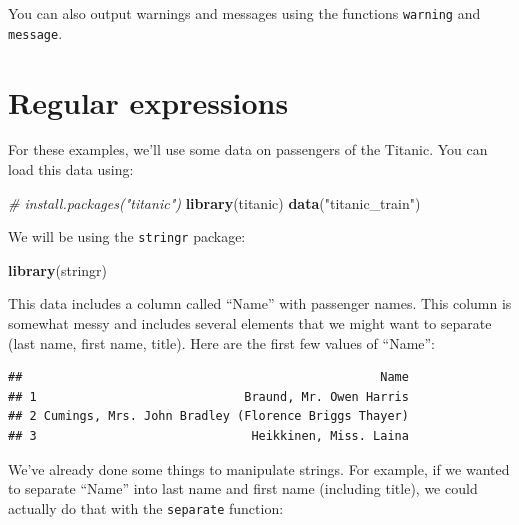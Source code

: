 \documentclass[]{book}
\makeatletter
\newenvironment{Shaded}{\begin{snugshade}}{\end{snugshade}}
\newcommand{\KeywordTok}[1]{\textcolor[rgb]{0.13,0.29,0.53}{\textbf{{#1}}}}
\newcommand{\DecValTok}[1]{\textcolor[rgb]{0.00,0.00,0.81}{{#1}}}
\newcommand{\StringTok}[1]{\textcolor[rgb]{0.31,0.60,0.02}{{#1}}}
\newcommand{\CommentTok}[1]{\textcolor[rgb]{0.56,0.35,0.01}{\textit{{#1}}}}
\newcommand{\NormalTok}[1]{{#1}}
\newenvironment{kframe}{%
\medskip{}
\setlength{\fboxsep}{.8em}
 \def\at@end@of@kframe{}%
 \ifinner\ifhmode%
  \def\at@end@of@kframe{\end{minipage}}%
  \begin{minipage}{\columnwidth}%
 \fi\fi%
 \def\FrameCommand##1{\hskip\@totalleftmargin \hskip-\fboxsep
 \colorbox{shadecolor}{##1}\hskip-\fboxsep
     \hskip-\linewidth \hskip-\@totalleftmargin \hskip\columnwidth}%
 \MakeFramed {\advance\hsize-\width
   \@totalleftmargin\z@ \linewidth\hsize
   \@setminipage}}%
 {\par\unskip\endMakeFramed%
 \at@end@of@kframe}
\renewenvironment{Shaded}{\begin{kframe}}{\end{kframe}}
\makeatother
\begin{document}
You can also output warnings and messages using the functions
\texttt{warning} and \texttt{message}.

\section{Regular expressions}\label{regular-expressions}

For these examples, we'll use some data on passengers of the Titanic.
You can load this data using:

\begin{Shaded}
\begin{Highlighting}[]
\CommentTok{# install.packages("titanic")}
\KeywordTok{library}\NormalTok{(titanic)}
\KeywordTok{data}\NormalTok{(}\StringTok{"titanic_train"}\NormalTok{)}
\end{Highlighting}
\end{Shaded}

We will be using the \texttt{stringr} package:

\begin{Shaded}
\begin{Highlighting}[]
\KeywordTok{library}\NormalTok{(stringr)}
\end{Highlighting}
\end{Shaded}

This data includes a column called ``Name'' with passenger names. This
column is somewhat messy and includes several elements that we might
want to separate (last name, first name, title). Here are the first few
values of ``Name'':

\begin{Shaded}
\end{Shaded}

\begin{verbatim}
##                                                  Name
## 1                             Braund, Mr. Owen Harris
## 2 Cumings, Mrs. John Bradley (Florence Briggs Thayer)
## 3                              Heikkinen, Miss. Laina
\end{verbatim}

We've already done some things to manipulate strings. For example, if we
wanted to separate ``Name'' into last name and first name (including
title), we could actually do that with the \texttt{separate} function:
\end{document}
